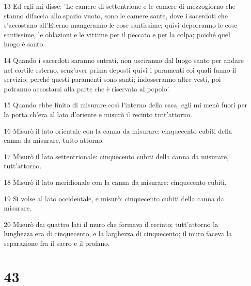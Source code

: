 \par 13 Ed egli mi disse: 'Le camere di settentrione e le camere di mezzogiorno che stanno difaccia allo spazio vuoto, sono le camere sante, dove i sacerdoti che s'accostano all'Eterno mangeranno le cose santissime; quivi deporranno le cose santissime, le oblazioni e le vittime per il peccato e per la colpa; poiché quel luogo è santo.
\par 14 Quando i sacerdoti saranno entrati, non usciranno dal luogo santo per andare nel cortile esterno, senz'aver prima deposti quivi i paramenti coi quali fanno il servizio, perché questi paramenti sono santi; indosseranno altre vesti, poi potranno accostarsi alla parte che è riservata al popolo'.
\par 15 Quando ebbe finito di misurare così l'interno della casa, egli mi menò fuori per la porta ch'era al lato d'oriente e misurò il recinto tutt'attorno.
\par 16 Misurò il lato orientale con la canna da misurare: cinquecento cubiti della canna da misurare, tutto attorno.
\par 17 Misurò il lato settentrionale: cinquecento cubiti della canna da misurare, tutt'attorno.
\par 18 Misurò il lato meridionale con la canna da misurare: cinquecento cubiti.
\par 19 Si volse al lato occidentale, e misurò: cinquecento cubiti della canna da misurare.
\par 20 Misurò dai quattro lati il muro che formava il recinto: tutt'attorno la lunghezza era di cinquecento, e la larghezza di cinquecento; il muro faceva la separazione fra il sacro e il profano.

\chapter{43}

